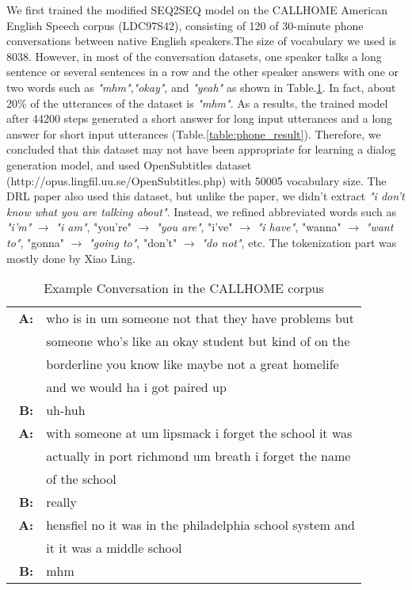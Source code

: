 We first trained the modified SEQ2SEQ model on the CALLHOME American English Speech corpus (LDC97S42), consisting of 120 of 30-minute phone conversations between native English speakers.The size of vocabulary we used is 8038. However, in most of the conversation datasets, one speaker talks a long sentence or several sentences in a row and the other speaker answers with one or two words such as \textit{"mhm"},\textit{"okay"}, and \textit{"yeah"} as shown in Table.\ref{table:phone_data}. In fact, about 20\% of the utterances of the dataset is \textit{"mhm"}. As a results, the trained model after 44200 steps generated a short answer for long input utterances and a long answer for short input utterances (Table.\ref{table:phone_result}). Therefore, we concluded that this dataset may not have been appropriate for learning a dialog generation model, and used OpenSubtitles dataset (http://opus.lingfil.uu.se/OpenSubtitles.php) with 50005 vocabulary size. The DRL paper also used this dataset, but unlike the paper, we didn't extract \textit{"i don't know what you are talking about"}. Instead, we refined abbreviated words such as \textit{"i'm"} $\rightarrow$ \textit{"i am"}, {"you're"} $\rightarrow$ \textit{"you are"}, {"i've"} $\rightarrow$ \textit{"i have"}, {"wanna"} $\rightarrow$ \textit{"want to"}, {"gonna"} $\rightarrow$ \textit{"going to"}, {"don't"} $\rightarrow$ \textit{"do not"}, etc. The tokenization part was mostly done by Xiao Ling.

\begin{table}[t!]
    \centering
    \small
    \caption{\small Example Conversation in the CALLHOME corpus}
    \begin{tabular}{rl}
      \hline
        \textbf{A:} & who is in um someone not that they have problems but\\
        		    & someone who's like an okay student but kind of on the\\
        			& borderline you know like maybe not a great homelife\\
        			& and we would ha i got paired up\\
		\textbf{B:} & uh-huh \\
\textbf{A:} & with someone at um lipsmack i forget the school it was\\
			& actually in port richmond um breath i forget the name\\
			& of the school\\\
\textbf{B:} & really\\
\textbf{A:} & hensfiel no it was in the philadelphia school system and\\ 
			& it it was a middle school\\
\textbf{B:} & mhm\\
      \hline
    \end{tabular}
    \label{table:phone_data}
\end{table}